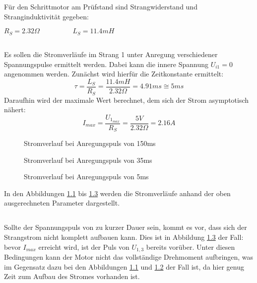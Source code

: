 \chapter{}\label{ch:aufg2}
Für den Schrittmotor am Prüfstand sind Strangwiderstand und Stranginduktivität gegeben:
\begin{center}
	$ R_{S} = 2.32\Omega \hspace{2cm} L_{S} = 11.4mH $
\end{center}

\section{}\label{sec:2a}
Es sollen die Stromverläufe im Strang 1 unter Anregung verschiedener Spannungspulse ermittelt werden. Dabei kann die innere Spannung $ U_{i1} = 0$ angenommen werden. Zunächst wird hierfür die Zeitkonstante ermittelt:
\begin{equation}
	\tau = \frac{L_{S}}{R_{S}} = \frac{11.4mH}{2.32\Omega} = 4.91ms \cong 5ms
\end{equation}
Daraufhin wird der maximale Wert berechnet, dem sich der Strom asymptotisch nähert:
\begin{equation}
	I_{max} = \frac{U_{1_{max}}}{R_{S}} = \frac{5V}{2.32\Omega} = 2.16A
\end{equation}

\begin{figure}[h]
	\centering
	
	\caption{Stromverlauf bei Anregungspuls von 150ms}
	\label{fig:2:150}
\end{figure}
\begin{figure}[h]
	\centering
	
	\caption{Stromverlauf bei Anregungspuls von 35ms}
	\label{fig:2:35}
\end{figure}
\begin{figure}[h]
	\centering
	
	\caption{Stromverlauf bei Anregungspuls von 5ms}
	\label{fig:2:5}
\end{figure}
In den Abbildungen \ref{fig:2:150} bis \ref{fig:2:5} werden die Stromverläufe anhand der oben ausgerechneten Parameter dargestellt.

\section{}\label{sec:2b}
Sollte der Spannungspuls von zu kurzer Dauer sein, kommt es vor, dass sich der Strangstrom nicht komplett aufbauen kann. Dies ist in Abbildung \ref{fig:2:5} der Fall: bevor $ I_{max} $ erreicht wird, ist der Puls von $ U_{1,3} $ bereits vorüber. Unter diesen Bedingungen kann der Motor nicht das vollständige Drehmoment aufbringen, was im Gegensatz dazu bei den Abbildungen \ref{fig:2:150} und \ref{fig:2:35} der Fall ist, da hier genug Zeit zum Aufbau des Stromes vorhanden ist.

